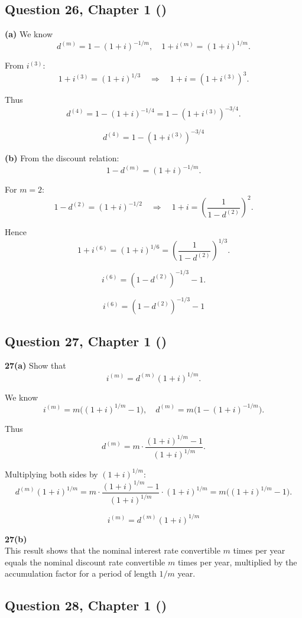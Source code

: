 \documentclass[12pt, a4paper]{article}
\begin{document}
\subsection*{Question 26, Chapter 1  (\cite{toi3rd})}

\textbf{(a)} We know
\[
d^{(m)} = 1 - (1+i)^{-1/m}, \quad 
1+i^{(m)} = (1+i)^{1/m}.
\]

From \(i^{(3)}\):
\[
1+i^{(3)} = (1+i)^{1/3} \quad \Rightarrow \quad 1+i = (1+i^{(3)})^3.
\]

Thus
\[
d^{(4)} = 1 - (1+i)^{-1/4} = 1 - (1+i^{(3)})^{-3/4}.
\]

\[
\boxed{d^{(4)} = 1 - (1+i^{(3)})^{-3/4}}
\]

\bigskip

\textbf{(b)} From the discount relation:
\[
1-d^{(m)} = (1+i)^{-1/m}.
\]

For \(m=2\):
\[
1-d^{(2)} = (1+i)^{-1/2} \quad \Rightarrow \quad 1+i = \left(\frac{1}{1-d^{(2)}}\right)^2.
\]

Hence
\[
1+i^{(6)} = (1+i)^{1/6} = \left(\frac{1}{1-d^{(2)}}\right)^{1/3}.
\]

\[
i^{(6)} = (1-d^{(2)})^{-1/3} - 1.
\]

\[
\boxed{i^{(6)} = (1-d^{(2)})^{-1/3} - 1}
\]

\subsection*{Question 27, Chapter 1  (\cite{toi3rd})}

\textbf{27(a)} Show that
\[
i^{(m)} = d^{(m)} (1+i)^{1/m}.
\]

We know
\[
i^{(m)} = m \big( (1+i)^{1/m} - 1 \big),
\quad 
d^{(m)} = m \big( 1 - (1+i)^{-1/m} \big).
\]

Thus
\[
d^{(m)} = m \cdot \frac{(1+i)^{1/m} - 1}{(1+i)^{1/m}}.
\]

Multiplying both sides by \((1+i)^{1/m}\):
\[
d^{(m)} (1+i)^{1/m} 
= m \cdot \frac{(1+i)^{1/m} - 1}{(1+i)^{1/m}} \cdot (1+i)^{1/m}
= m \big( (1+i)^{1/m} - 1 \big).
\]

\[
\boxed{i^{(m)} = d^{(m)} (1+i)^{1/m}}
\]

\bigskip
\textbf{27(b)} \\
This result shows that the nominal interest rate convertible \(m\) times per year
equals the nominal discount rate convertible \(m\) times per year,
multiplied by the accumulation factor for a period of length \(1/m\) year.

\subsection*{Question 28, Chapter 1  (\cite{toi3rd})}
\end{document}
